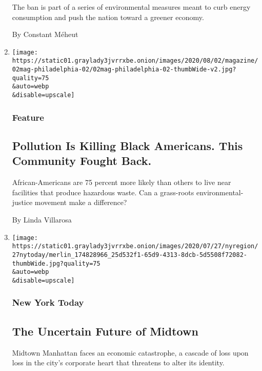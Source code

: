 \begin{enumerate}
  The ban is part of a series of environmental measures meant to curb
  energy consumption and push the nation toward a greener economy.

  By Constant Méheut
\item
  \href{/2020/07/28/magazine/pollution-philadelphia-black-americans.html}{}

  \texttt{[image: https://static01.graylady3jvrrxbe.onion/images/2020/08/02/magazine/02mag-philadelphia-02/02mag-philadelphia-02-thumbWide-v2.jpg?quality=75\\\&auto=webp\\\&disable=upscale]}

  \hypertarget{feature}{%
  \subsubsection{Feature}\label{feature}}

  \hypertarget{pollution-is-killing-black-americans-this-community-fought-back}{%
  \subsection{Pollution Is Killing Black Americans. This Community
  Fought
  Back.}\label{pollution-is-killing-black-americans-this-community-fought-back}}

  African-Americans are 75 percent more likely than others to live near
  facilities that produce hazardous waste. Can a grass-roots
  environmental-justice movement make a difference?

  By Linda Villarosa
\item
  \href{/2020/07/27/nyregion/nyc-midtown-manhattan-coronavirus.html}{}

  \texttt{[image: https://static01.graylady3jvrrxbe.onion/images/2020/07/27/nyregion/27nytoday/merlin\_174828966\_25d532f1-65d9-4313-8dcb-5d5508f72082-thumbWide.jpg?quality=75\\\&auto=webp\\\&disable=upscale]}

  \hypertarget{new-york-today}{%
  \subsubsection{New York Today}\label{new-york-today}}

  \hypertarget{the-uncertain-future-of-midtown}{%
  \subsection{The Uncertain Future of
  Midtown}\label{the-uncertain-future-of-midtown}}

  Midtown Manhattan faces an economic catastrophe, a cascade of loss
  upon loss in the city's corporate heart that threatens to alter its
  identity.~


\end{enumerate}
